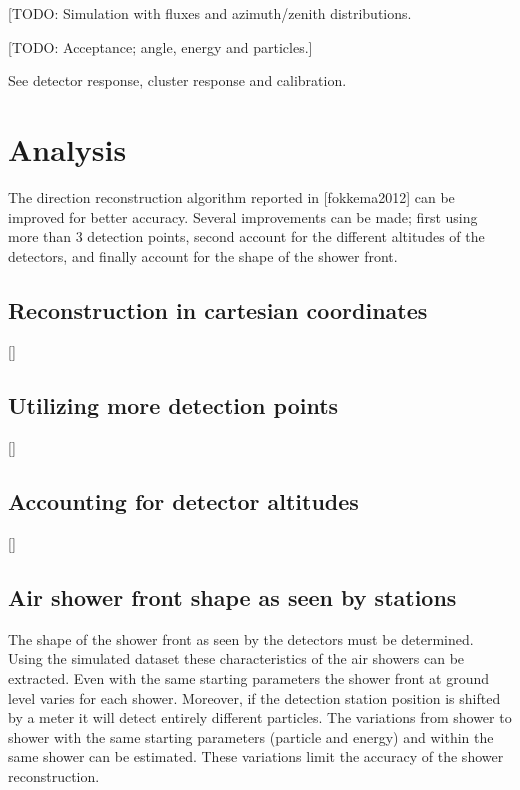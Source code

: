[TODO: Simulation with fluxes and azimuth/zenith distributions.

[TODO: Acceptance; angle, energy and particles.]

See detector response, cluster response and calibration.


\section{Analysis}

The direction reconstruction algorithm reported in [fokkema2012] can be improved for better accuracy. Several improvements can be made; first using more than 3 detection points, second account for the different altitudes of the detectors, and finally account for the shape of the shower front.


\subsection{Reconstruction in cartesian coordinates}

[]%


\subsection{Utilizing more detection points}

[]%


\subsection{Accounting for detector altitudes}

[]%


\subsection{Air shower front shape as seen by stations}

The shape of the shower front as seen by the detectors must be determined. Using the simulated dataset these characteristics of the air showers can be extracted. Even with the same starting parameters the shower front at ground level varies for each shower. Moreover, if the detection station position is shifted by a meter it will detect entirely different particles. The variations from shower to shower with the same starting parameters (particle and energy) and within the same shower can be estimated. These variations limit the accuracy of the shower reconstruction.


